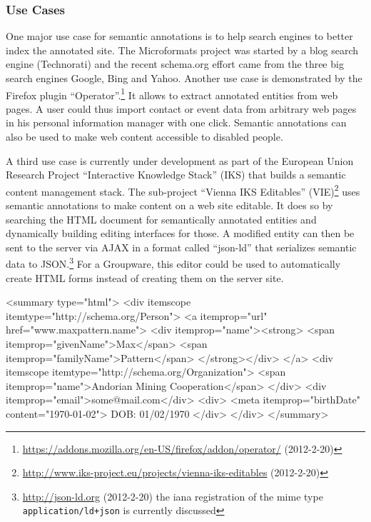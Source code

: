 \documentclass[12pt,a4paper,twoside]{scrartcl}		%
\newcommand{\citeurl}[2]{\url{#1} (#2)}
\begin{document}
\subsubsection{Use Cases}
\label{sec:semantic-anno-use-cases}

One major use case for semantic annotations is to help search engines to better
index the annotated site. The Microformats project was started by a blog search
engine (Technorati)\cite{Celik2006} and the recent schema.org effort came from
the three big search engines Google, Bing and Yahoo.\cite{Goel2011} Another use
case is demonstrated by the Firefox plugin
``Operator''.\footnote{\citeurl{https://addons.mozilla.org/en-US/firefox/addon/operator/}{2012-2-20}}
It allows to extract annotated entities from web pages. A user could thus import
contact or event data from arbitrary web pages in his personal information
manager with one click. Semantic annotations can also be used to make web
content accessible to disabled people\cite{Yesilada:2007:EDS:1279700.1279704}.

A third use case is currently under development as part of the European Union
Research Project ``Interactive Knowledge Stack'' (IKS) that builds a semantic
content management stack. The sub-project ``Vienna IKS Editables''
(VIE)\footnote{\citeurl{http://www.iks-project.eu/projects/vienna-iks-editables}{2012-2-20}}
uses semantic annotations to make content on a web site editable. It does so by
searching the HTML document for semantically annotated entities and dynamically
building editing interfaces for those. A modified entity can then be sent to the
server via AJAX in a format called ``json-ld'' that serializes semantic data to
JSON.\footnote{\citeurl{http://json-ld.org}{2012-2-20} the iana registration of
  the mime type \lstinline:application/ld+json: is currently discussed}
For a Groupware, this editor could be used to automatically create HTML forms instead
of creating them on the server site.

\begin{anylisting}[label=fig:microdata-atom-summary,
                   language=xml,
                   caption={Microdata used in the summary of an ATOM entry summary (markup not escaped for clarity)}]
<summary type="html">
  <div itemscope itemtype="http://schema.org/Person">
    <a itemprop="url" href="www.maxpattern.name">
      <div itemprop="name"><strong>
        <span itemprop="givenName">Max</span>
        <span itemprop="familyName">Pattern</span>
      </strong></div>
    </a>
    <div itemscope itemtype="http://schema.org/Organization">
      <span itemprop="name">Andorian Mining Cooperation</span>
    </div>
    <div itemprop="email">some@mail.com</div>
    <div>
      <meta itemprop="birthDate" content="1970-01-02">
      DOB: 01/02/1970
    </div>
  </div>
</summary>  
\end{anylisting}
\end{document}
